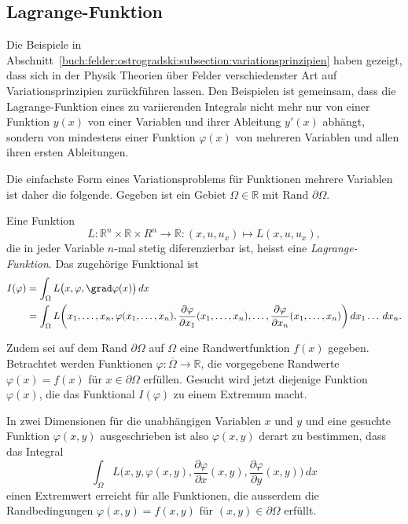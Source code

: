 %
%
\subsection{Lagrange-Funktion}
Die Beispiele in
Abschnitt~\ref{buch:felder:ostrogradski:subsection:variationsprinzipien}
haben gezeigt, dass sich in der Physik Theorien über Felder verschiedenster
Art auf Variationsprinzipien zurückführen lassen.
Den Beispielen ist gemeinsam, dass die Lagrange-Funktion eines zu
variierenden Integrals nicht mehr nur von einer Funktion $y(x)$ von
einer Variablen und ihrer Ableitung $y'(x)$ abhängt, sondern von mindestens
einer Funktion $\varphi(x)$ von mehreren Variablen und allen ihren
ersten Ableitungen.

Die einfachste Form eines Variationsproblems für Funktionen mehrere
Variablen ist daher die folgende.
Gegeben ist ein Gebiet $\Omega\in\mathbb{R}$ mit Rand $\partial\Omega$.

\begin{definition}
Eine Funktion
\[
L
\colon
\mathbb{R}^n\times\mathbb{R}\times{R}^n
\to
\mathbb{R}
:
(x,u,u_x)
\mapsto
L(x,u,u_x),
\]
die in jeder Variable $n$-mal stetig diferenzierbar ist, heisst eine
{\em Lagrange-Funktion}.
Das zugehörige Funktional ist
\begin{equation}
\begin{aligned}
I(\varphi)
&=
\int_{\Omega}
L\bigl(x,\varphi,\grad\varphi(x)\bigr)
\,dx
\\
&=
\int_{\Omega} 
L\biggl(
x_1,\dots,x_n,
\varphi(x_1,\dots,x_n),
\frac{\partial \varphi}{\partial x_1}(x_1,\dots,x_n),
\dots,
\frac{\partial \varphi}{\partial x_n}(x_1,\dots,x_n)
\biggr)
\,dx_1\dots\,dx_n.
\end{aligned}
\label{buch:felder:astrogradski:eqn:Lfunktional}
\end{equation}
\end{definition}

Zudem sei auf dem Rand $\partial\Omega$ auf $\Omega$
eine Randwertfunktion
$f(x)$ gegeben.
Betrachtet werden Funktionen
$\varphi\colon\overline{\Omega}\to \mathbb{R}$,
die vorgegebene Randwerte
\(
\varphi(x) = f(x)
\)
für $x\in\partial\Omega$ erfüllen.
Gesucht wird jetzt diejenige Funktion $\varphi(x)$, die das Funktional
$I(\varphi)$ zu einem Extremum macht.

In zwei Dimensionen für die unabhängigen Variablen $x$ und $y$
und eine gesuchte Funktion $\varphi(x,y)$ ausgeschrieben ist also
$\varphi(x,y)$ derart zu bestimmen, dass das Integral
\[
\int_{\Omega}
L\biggl(
x,y,\varphi(x,y),
\frac{\partial\varphi}{\partial x}(x,y),
\frac{\partial\varphi}{\partial y}(x,y)
\biggr)
\,dx
\]
einen Extremwert erreicht für alle Funktionen, die ausserdem die 
Randbedingungen $\varphi(x,y)=f(x,y)$ für $(x,y)\in\partial\Omega$ erfüllt.

